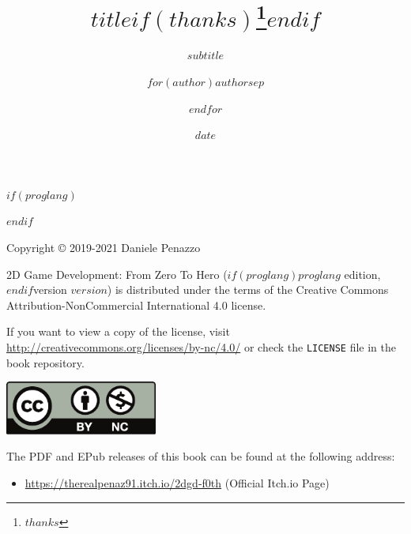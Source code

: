 \documentclass{article}
\title{$title$$if(thanks)$\thanks{$thanks$}$endif$}
\subtitle{$subtitle$}
\author{$for(author)$$author$$sep$ \and $endfor$}
\institute{$for(institute)$$institute$$sep$ \and $endfor$}
\date{$date$}
\begin{document}
\pagestyle{empty}
\begin{titlepage}
    \BgThispage
    $if(proglang)$
    \def \proglang{$proglang$}
    $endif$
    \null
    \newpage
\end{titlepage}

\clearpage
\null
Copyright © 2019-2021 Daniele Penazzo\\

\vspace{12pt}

2D Game Development: From Zero To Hero ($if(proglang)$$proglang$ edition, $endif$version $version$) is distributed under the terms of the Creative Commons Attribution-NonCommercial International 4.0 license.\\

\vspace{12pt}

If you want to view a copy of the license, visit \url{http://creativecommons.org/licenses/by-nc/4.0/} or check the \texttt{LICENSE} file in the book repository.

\vspace{24pt}

\includegraphics[width=50mm]{images/by-nc.pdf}

The PDF and EPub releases of this book can be found at the following address:
\begin{itemize}
    \item \url{https://therealpenaz91.itch.io/2dgd-f0th} (Official Itch.io Page)
\end{itemize}
\end{document}
